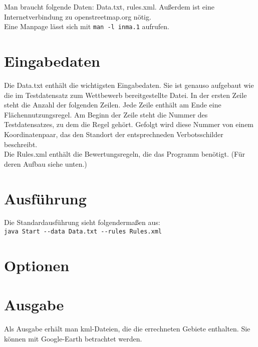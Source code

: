Man braucht folgende Daten: Data.txt, rules.xml. Außerdem ist eine Internetverbindung zu openstreetmap.org nötig.\\
Eine Manpage lässt sich mit \verb|man -l inma.1| aufrufen.
\section{Eingabedaten}
Die Data.txt enthält die wichtigsten Eingabedaten. Sie ist genauso aufgebaut wie die im Testdatensatz zum Wettbewerb bereitgestellte Datei.
In der ersten Zeile steht die Anzahl der folgenden Zeilen. Jede Zeile enthält am Ende eine Flächennutzungsregel. Am Beginn der Zeile steht
die Nummer des Testdatensatzes, zu dem die Regel gehört. Gefolgt wird diese Nummer von einem Koordinatenpaar, das den Standort der 
entsprechneden Verbotsschilder beschreibt.\\
Die Rules.xml enthält die Bewertungsregeln, die das Programm benötigt. (Für deren Aufbau siehe unten.)
\section{Ausführung}
Die Standardausführung sieht folgendermaßen aus:\\
\verb|java Start --data Data.txt --rules Rules.xml|
\section{Optionen}
\section{Ausgabe}
Als Ausgabe erhält man kml-Dateien, die die errechneten Gebiete enthalten. Sie können mit Google-Earth betrachtet werden.